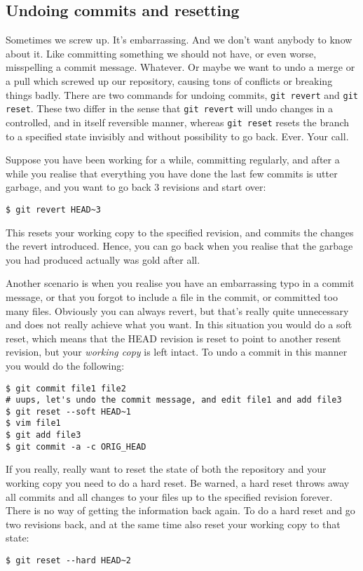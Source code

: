 \documentclass[a4paper,10pt]{article}
\begin{document}
\subsection{Undoing commits and resetting}
Sometimes we screw up. It's embarrassing. And we don't want anybody to know
about it. Like committing something we should not have, or even worse,
misspelling a commit message. Whatever. Or maybe we want to undo a merge or a
pull which screwed up our repository, causing tons of conflicts or breaking
things badly. There are two commands for undoing commits, \texttt{git revert}
and \texttt{git reset}. These two differ in the sense that \texttt{git revert}
will undo changes in a controlled, and in itself reversible manner, whereas
\texttt{git reset} resets the branch to a specified state invisibly and
without possibility to go back. Ever. Your call.

Suppose you have been working for a while, committing regularly, and after a
while you realise that everything you have done the last few commits is utter
garbage, and you want to go back 3 revisions and start over:
\begin{verbatim}
$ git revert HEAD~3
\end{verbatim}
This resets your working copy to the specified revision, and commits the
changes the revert introduced. Hence, you can go back when you realise that
the garbage you had produced actually was gold after all.

Another scenario is when you realise you have an embarrassing typo in a commit
message, or that you forgot to include a file in the commit, or committed
too many files. Obviously you can always revert, but that's really quite
unnecessary and does not really achieve what you want. In this situation you
would do a soft reset, which means that the HEAD revision is reset to point to 
another resent revision, but your \emph{working copy} is left intact. To undo
a commit in this manner you would do the following:
\begin{verbatim}
$ git commit file1 file2 
# uups, let's undo the commit message, and edit file1 and add file3 
$ git reset --soft HEAD~1  
$ vim file1 
$ git add file3
$ git commit -a -c ORIG_HEAD
\end{verbatim}

If you really, really want to reset the state of both the repository and your
working copy you need to do a hard reset. Be warned, a hard reset throws away
all commits and all changes to your files up to the specified revision forever. 
There is no way of getting the information back again. To do a hard reset and
go two revisions back, and at the same time also reset your working copy to
that state:
\begin{verbatim}
$ git reset --hard HEAD~2
\end{verbatim}
\end{document}
